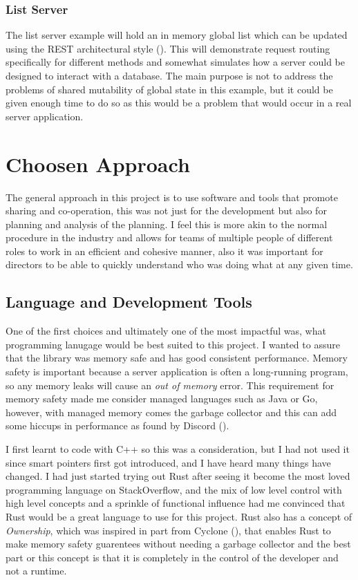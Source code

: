 \documentclass[12pt, a4paper]{article}
\begin{document}
\subsubsection{List Server}

The list server example will hold an in memory global list which can be updated using the REST
architectural style (\cite{rest}).
This will demonstrate request routing specifically for different methods and somewhat simulates how
a server could be designed to interact with a database. The main purpose is not to address the problems
of shared mutability of global state in this example, but it could be given enough time to do so as
this would be a problem that would occur in a real server application.

\section{Choosen Approach} \label{sec:choosen-approach}

The general approach in this project is to use software and tools that promote sharing and
co-operation, this was not just for the development but also for planning and analysis of the
planning. I feel this is more akin to the normal procedure in the industry and allows for teams of
multiple people of different roles to work in an efficient and cohesive manner, also it was important
for directors to be able to quickly understand who was doing what at any given time.

\subsection{Language and Development Tools}

One of the first choices and ultimately one of the most impactful was, what programming lanugage
would be best suited to this project. I wanted to assure that the library was memory safe and has
good consistent performance. Memory safety is important because a server application is often a
long-running program, so any memory leaks will cause an \emph{out of memory} error. This requirement
for memory safety made me consider managed languages such as Java or Go, however, with managed memory
comes the garbage collector and this can add some hiccups in performance as found by Discord (\cite{discord}).

I first learnt to code with C++ so this was a consideration, but I had not used it since smart pointers
first got introduced, and I have heard many things have changed. I had just started trying out Rust
after seeing it become the most loved programming language on StackOverflow, and the mix of low level
control with high level concepts and a sprinkle of functional influence had me convinced that Rust
would be a great language to use for this project. Rust also has a concept of \emph{Ownership},
which was inspired in part from Cyclone (\cite{cyclone}), that enables Rust to make memory safety
guarentees without needing a garbage collector and the best part or this concept is that it is
completely in the control of the developer and not a runtime.
\end{document}
